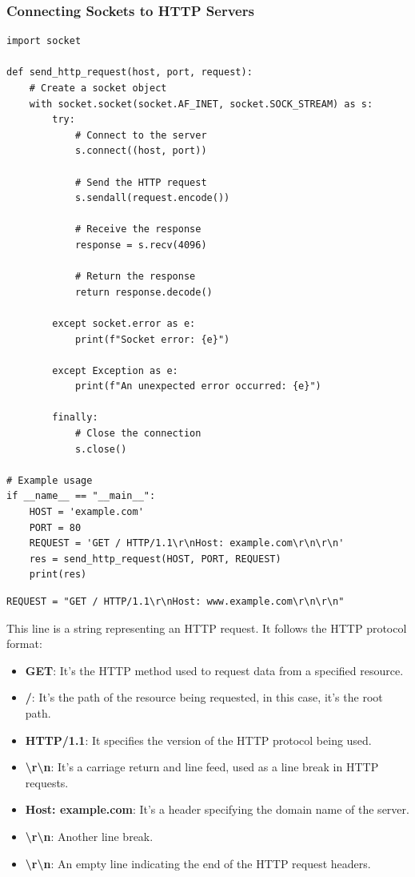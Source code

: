 \subsubsection{Connecting Sockets to HTTP Servers}
\begin{codebox}
\begin{verbatim}
import socket

def send_http_request(host, port, request):
    # Create a socket object
    with socket.socket(socket.AF_INET, socket.SOCK_STREAM) as s:
        try:
            # Connect to the server
            s.connect((host, port))
            
            # Send the HTTP request
            s.sendall(request.encode())
            
            # Receive the response
            response = s.recv(4096)
            
            # Return the response
            return response.decode()
        
        except socket.error as e:
            print(f"Socket error: {e}")
        
        except Exception as e:
            print(f"An unexpected error occurred: {e}")
        
        finally:
            # Close the connection
            s.close()

# Example usage
if __name__ == "__main__":
    HOST = 'example.com'
    PORT = 80
    REQUEST = 'GET / HTTP/1.1\r\nHost: example.com\r\n\r\n'
    res = send_http_request(HOST, PORT, REQUEST)
    print(res)
\end{verbatim}
\end{codebox}

\begin{codebox}
\begin{verbatim}
REQUEST = "GET / HTTP/1.1\r\nHost: www.example.com\r\n\r\n"
\end{verbatim}
\end{codebox}

This line is a string representing an HTTP request. It follows the HTTP protocol format:

\begin{itemize}
    \item \textbf{GET}: It's the HTTP method used to request data from a specified resource.
    \item \textbf{/}: It's the path of the resource being requested, in this case, it's the root path.
    \item \textbf{HTTP/1.1}: It specifies the version of the HTTP protocol being used.
    \item \textbf{\textbackslash r\textbackslash n}: It's a carriage return and line feed, used as a line break in HTTP requests.
    \item \textbf{Host: example.com}: It's a header specifying the domain name of the server.
    \item \textbf{\textbackslash r\textbackslash n}: Another line break.
    \item \textbf{\textbackslash r\textbackslash n}: An empty line indicating the end of the HTTP request headers.
\end{itemize}

